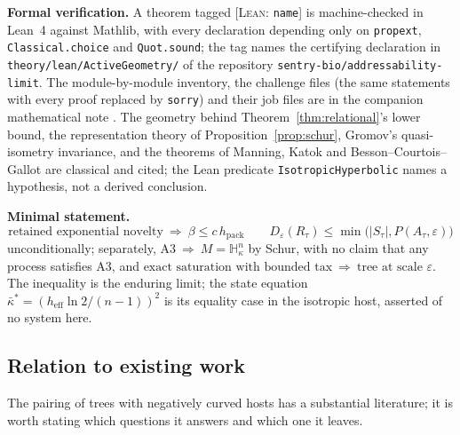 \documentclass[11pt,reqno]{amsart}
\theoremstyle{plain}
\theoremstyle{definition}
\newcommand{\hpack}{h_{\mathrm{pack}}}
\newcommand{\heff}{h_{\mathrm{eff}}}
\newcommand{\Hk}{\mathbb{H}^n_\kappa}
\newcommand{\eps}{\varepsilon}
\begin{document}
\medskip
\noindent\textbf{Formal verification.}\label{sec:lean} A theorem tagged [\textsc{Lean}: \texttt{name}] is machine-checked in Lean~4 against Mathlib, with every declaration depending only on \texttt{propext}, \texttt{Classical.choice} and \texttt{Quot.sound}; the tag names the certifying declaration in \texttt{theory/lean/ActiveGeometry/} of the repository \texttt{sentry-bio/addressability-limit}. The module-by-module inventory, the challenge files (the same statements with every proof replaced by \texttt{sorry}) and their job files are in the companion mathematical note \cite{fennfennnote}. The geometry behind Theorem~\ref{thm:relational}'s lower bound, the representation theory of Proposition~\ref{prop:schur}, Gromov's quasi-isometry invariance, and the theorems of Manning, Katok and Besson--Courtois--Gallot are classical and cited; the Lean predicate \texttt{IsotropicHyperbolic} names a hypothesis, not a derived conclusion.

\medskip
\noindent\textbf{Minimal statement.}
\[
\boxed{\text{retained exponential novelty}\ \Longrightarrow\ \beta\le c\,\hpack}\qquad
\boxed{D_\eps(R_\tau)\le\min\bigl(|S_\tau|,P(A_\tau,\eps)\bigr)}
\]
unconditionally; separately, $\boxed{\text{A3}\ \Longrightarrow\ M=\Hk}$ by Schur, with no claim that any process satisfies A3, and $\boxed{\text{exact saturation with bounded tax}\ \Longrightarrow\ \text{tree at scale }\eps}$. The inequality is the enduring limit; the state equation $\bar\kappa^*=(\heff\ln2/(n-1))^2$ is its equality case in the isotropic host, asserted of no system here.

\subsection{Relation to existing work}\label{sec:related}

The pairing of trees with negatively curved hosts has a substantial literature; it is worth stating which questions it answers and which one it leaves.
\end{document}
